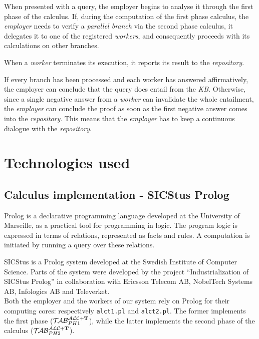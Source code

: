 \documentclass[a4paper, 11pt, oneside]{duthesis}
\newcommand{\tip}{{\bf T}}
\newcommand{\primo}{\mathrel{{\mathcal{T}\!\mathcal{AB}}}_{PH 1}^{\mathcal{ALC}+\mbox{\scriptsize $\tip$}}}
\newcommand{\secondo}{\mathrel{{\mathcal{T}\!\mathcal{AB}}}_{PH 2}^{\mathcal{ALC}+\mbox{\scriptsize $\tip$}}}
\begin{document}
When presented with a query, the employer begins to analyse it through the first phase of the calculus.
If, during the computation of the first phase calculus, the \emph{employer} needs to verify a \emph{parallel branch} via the second phase calculus, it delegates it to one of the registered \emph{workers}, and consequently proceeds with its calculations on other branches.

When a \emph{worker} terminates its execution, it reports its result to the \emph{repository}.

If every branch has been processed and each worker has answered affirmatively, the employer can conclude that the query does entail from the \emph{KB}.
Otherwise, since a single negative answer from a \emph{worker} can invalidate the whole entailment, the \emph{employer} can conclude the proof as soon as the first negative answer comes into the \emph{repository}.
This means that the \emph{employer} has to keep a continuous dialogue with the \emph{repository}.

\newpage

\section{Technologies used}


\subsection{Calculus implementation - SICStus Prolog}

Prolog is a declarative programming language developed at the University of Marseille, as a practical tool for programming in logic. The program logic is expressed in terms of relations, represented as facts and rules. A computation is initiated by running a query over these relations\cite{Lloyd:1984:FLP:2214}.

SICStus is a Prolog system developed at the Swedish Institute of Computer Science. Parts of the system were developed by the project “Industrialization of SICStus Prolog” in collaboration with Ericsson Telecom AB, NobelTech Systems AB, Infologics AB and Televerket\cite{sicstus_intro}.\\

Both the employer and the workers of our system rely on Prolog for their computing cores: respectively \verb$alct1.pl$ and \verb$alct2.pl$. The former implements the first phase ($\primo$), while the latter implements the second phase of the calculus ($\secondo$).
\end{document}
